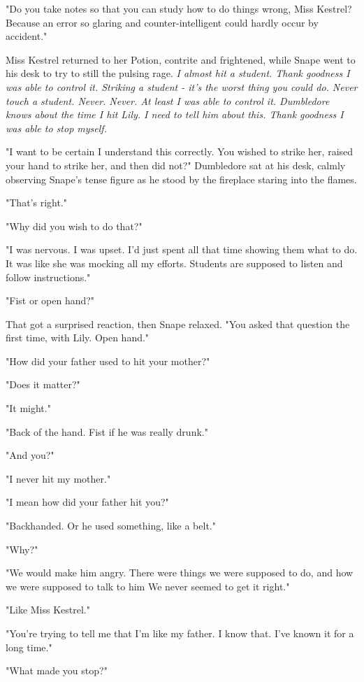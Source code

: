 "Do you take notes so that you can study how to do things wrong, Miss Kestrel? Because an error so glaring and counter-intelligent could hardly occur by accident."

Miss Kestrel returned to her Potion, contrite and frightened, while Snape went to his desk to try to still the pulsing rage. \emph{I almost hit a student. Thank goodness I was able to control it. Striking a student - it's the worst thing you could do. Never touch a student. Never. Never. At least I was able to control it. Dumbledore knows about the time I hit Lily. I need to tell him about this. Thank goodness I was able to stop myself.}

"I want to be certain I understand this correctly. You wished to strike her, raised your hand to strike her, and then did not?" Dumbledore sat at his desk, calmly observing Snape's tense figure as he stood by the fireplace staring into the flames.

"That's right."

"Why did you wish to do that?"

"I was nervous. I was upset. I'd just spent all that time showing them what to do. It was like she was mocking all my efforts. Students are supposed to listen and follow instructions."

"Fist or open hand?"

That got a surprised reaction, then Snape relaxed. "You asked that question the first time, with Lily. Open hand."

"How did your father used to hit your mother?"

"Does it matter?"

"It might."

"Back of the hand. Fist if he was really drunk."

"And you?"

"I never hit my mother."

"I mean how did your father hit you?"

"Backhanded. Or he used something, like a belt."

"Why?"

"We would make him angry. There were things we were supposed to do, and{\el} how we were supposed to talk to him{\el} We never seemed to get it right."

"Like Miss Kestrel."

"You're trying to tell me that I'm like my father. I know that. I've known it for a long time."

"What made you stop?"

